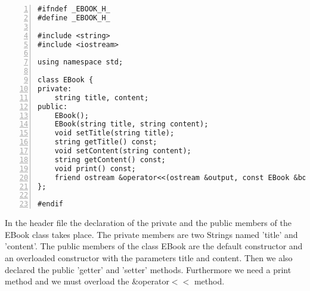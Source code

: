 \documentclass{article}
\begin{document}
\begin{lstlisting}[basicstyle=\footnotesize\ttfamily, numbers=left, stepnumber=1, numberstyle = \normalsize]
#ifndef _EBOOK_H_
#define _EBOOK_H_

#include <string>
#include <iostream>

using namespace std;

class EBook {
private:
	string title, content; 
public:
	EBook();
	EBook(string title, string content);
	void setTitle(string title);
	string getTitle() const;
	void setContent(string content);
	string getContent() const;
	void print() const;
	friend ostream &operator<<(ostream &output, const EBook &book);
};

#endif

\end{lstlisting}
\normalsize{In the header file the declaration of the private and the public members of the EBook class takes place.\newline
The private members are two Strings named 'title' and 'content'.
The public members of the class EBook are the default constructor and an overloaded constructor with the parameters title and content.\newline 
Then we also declared the public 'getter' and 'setter' methods. Furthermore we need a print method and we must overload the \&operator$<<$ method.}\newline

\newpage
\end{document}
